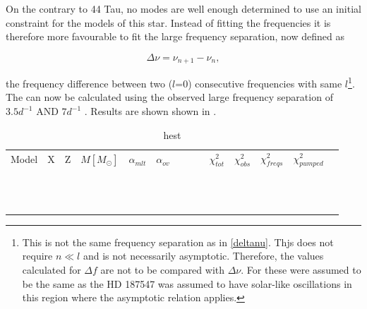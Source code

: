 On the contrary to 44 Tau, no modes are well enough determined to use an initial constraint for the models of this star. Instead of fitting the frequencies it is therefore more favourable to fit the large frequency separation, now defined as

\begin{equation}
    \Delta\nu = \nu_{n+1} - \nu_{n},
\end{equation}

\noindent the frequency difference between two ($l$=0) consecutive frequencies with same $l$\footnote{This is not the same frequency separation as in \eqref{deltanu}. Thjs does not require $n \ll l$ and is not necessarily asymptotic. Therefore, the values calculated for $\Delta f$ are not to be compared with $\Delta \nu$. For \citet{antoci2011excitation} these were assumed to be the same as the HD 187547 was assumed to have solar-like oscillations in this region where the asymptotic relation applies.}.  The \chis can now be calculated using the observed large frequency separation of $3.5d^{-1}$ AND $7d^{-1}$ \citep{antoci2014role}. Results are shown shown in .

\begin{table}
  \caption{hest}
  \label{tab:superstar}

	\begin{tabular}{llllllllllllll}
	 Model & X & Z & $M[M_\odot]$ & $\alpha_{mlt}$ & $\alpha_{ov}$ & \teff  & \logg  & \lum & $\chi_{tot}^2$ &$\chi_{obs}^2$ & $\chi_{freqs}^2$ & $\chi_{pumped}^2$\\
	 &  &  &  &  &  &  &  &  &  &  \\
 	&  &  &  &  &  &  &  &  &  &  \\
 	&  &  &  &  &  &  &  &  &  &  \\
	 &  &  &  &  &  &  &  &  &  &  \\
 	&  &  &  &  &  &  &  &  &  &  \\
	 &  &  &  &  &  &  &  &  &  &  \\
	 &  &  &  &  &  &  &  &  &  &  \\
	 &  &  &  &  &  &  &  &  &  &  \\
	 &  &  &  &  &  &  &  &  &  &  \\
	 &  &  &  &  &  &  &  &  &  &  \\
 	&  &  &  &  &  &  &  &  &  &  \\
 	&  &  &  &  &  &  &  &  &  &  \\
	\end{tabular}
\end{table}

